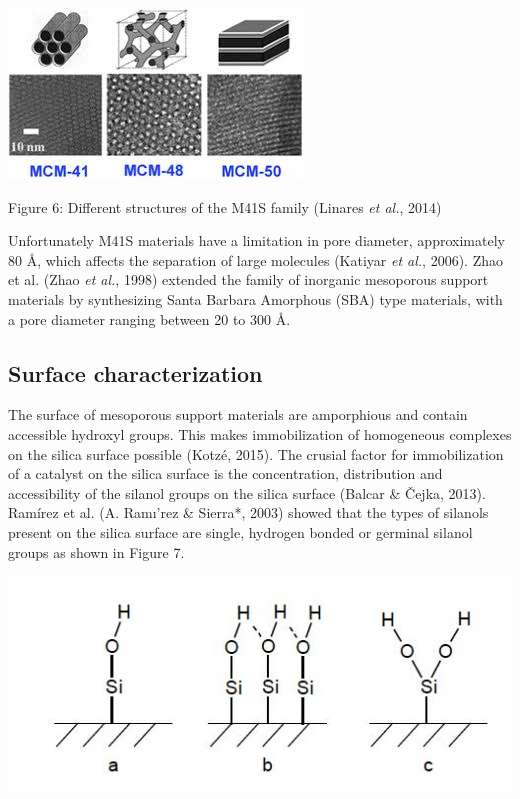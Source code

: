 \documentclass[]{article}
\begin{document}
\begin{center}\includegraphics[width=0.9\linewidth]{Data/Images/Mcm-structures} \end{center}

Figure 6: Different structures of the M41S family (Linares \emph{et
al.}, 2014)

Unfortunately M41S materials have a limitation in pore diameter,
approximately 80 Å, which affects the separation of large molecules
(Katiyar \emph{et al.}, 2006). Zhao et al. (Zhao \emph{et al.}, 1998)
extended the family of inorganic mesoporous support materials by
synthesizing Santa Barbara Amorphous (SBA) type materials, with a pore
diameter ranging between 20 to 300 Å.

\hypertarget{surface-characterization}{%
\subsection{Surface characterization}\label{surface-characterization}}

The surface of mesoporous support materials are amporphious and contain
accessible hydroxyl groups. This makes immobilization of homogeneous
complexes on the silica surface possible (Kotzé, 2015). The crusial
factor for immobilization of a catalyst on the silica surface is the
concentration, distribution and accessibility of the silanol groups on
the silica surface (Balcar \& Čejka, 2013). Ramírez et al. (A. Ramı'rez
\& Sierra*, 2003) showed that the types of silanols present on the
silica surface are single, hydrogen bonded or germinal silanol groups as
shown in Figure 7.

\begin{center}\includegraphics[width=7.11in]{Data/Images/Silanol_groups} \end{center}
\end{document}
